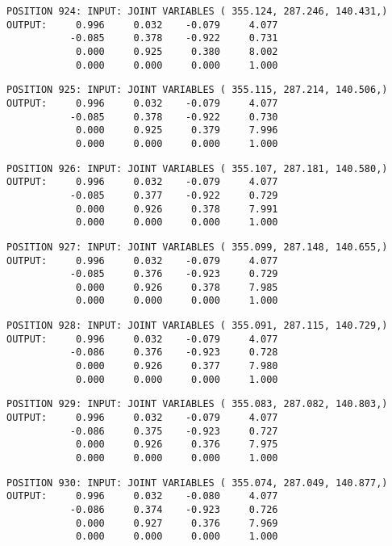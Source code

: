 \begin{verbatim}
POSITION 924: INPUT: JOINT VARIABLES ( 355.124, 287.246, 140.431,)
OUTPUT:     0.996     0.032    -0.079     4.077
           -0.085     0.378    -0.922     0.731
            0.000     0.925     0.380     8.002
            0.000     0.000     0.000     1.000
\end{verbatim} \pagebreak[1]\begin{verbatim}
POSITION 925: INPUT: JOINT VARIABLES ( 355.115, 287.214, 140.506,)
OUTPUT:     0.996     0.032    -0.079     4.077
           -0.085     0.378    -0.922     0.730
            0.000     0.925     0.379     7.996
            0.000     0.000     0.000     1.000
\end{verbatim} \pagebreak[1]\begin{verbatim}
POSITION 926: INPUT: JOINT VARIABLES ( 355.107, 287.181, 140.580,)
OUTPUT:     0.996     0.032    -0.079     4.077
           -0.085     0.377    -0.922     0.729
            0.000     0.926     0.378     7.991
            0.000     0.000     0.000     1.000
\end{verbatim} \pagebreak[1]\begin{verbatim}
POSITION 927: INPUT: JOINT VARIABLES ( 355.099, 287.148, 140.655,)
OUTPUT:     0.996     0.032    -0.079     4.077
           -0.085     0.376    -0.923     0.729
            0.000     0.926     0.378     7.985
            0.000     0.000     0.000     1.000
\end{verbatim} \pagebreak[1]\begin{verbatim}
POSITION 928: INPUT: JOINT VARIABLES ( 355.091, 287.115, 140.729,)
OUTPUT:     0.996     0.032    -0.079     4.077
           -0.086     0.376    -0.923     0.728
            0.000     0.926     0.377     7.980
            0.000     0.000     0.000     1.000
\end{verbatim} \pagebreak[1]\begin{verbatim}
POSITION 929: INPUT: JOINT VARIABLES ( 355.083, 287.082, 140.803,)
OUTPUT:     0.996     0.032    -0.079     4.077
           -0.086     0.375    -0.923     0.727
            0.000     0.926     0.376     7.975
            0.000     0.000     0.000     1.000
\end{verbatim} \pagebreak[1]\begin{verbatim}
POSITION 930: INPUT: JOINT VARIABLES ( 355.074, 287.049, 140.877,)
OUTPUT:     0.996     0.032    -0.080     4.077
           -0.086     0.374    -0.923     0.726
            0.000     0.927     0.376     7.969
            0.000     0.000     0.000     1.000
\end{verbatim} \pagebreak[1]\begin{verbatim}

\end{verbatim}
